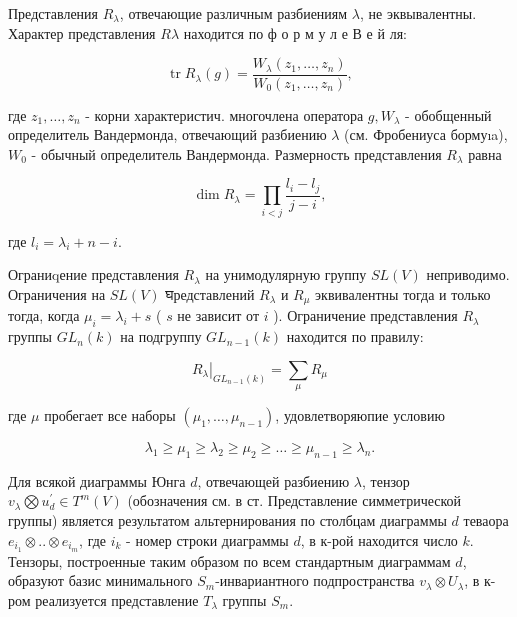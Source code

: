 \documentclass[10pt]{article}
\begin{document}
Представления $R_{\lambda}$, отвечающие различным разбиениям $\lambda$, не эквывалентны. Характер представления $R \lambda$ находится по ф о р м у л е В е й ля:



\[

\operatorname{tr} R_{\lambda}(g)=\frac{W_{\lambda}\left(z_{1}, \ldots, z_{n}\right)}{W_{0}\left(z_{1}, \ldots, z_{n}\right)},

\]



где $z_{1}, \ldots, z_{n}$ - корни характеристич. многочлена оператора $g, W_{\lambda}$ - обобщенный определитель Вандермонда, отвечающий разбиению $\lambda$ (см. Фробениуса бормуıa), $W_{0}$ - обычный определитель Вандермонда. Размерность представления $R_{\lambda}$ равна



\[

\operatorname{dim} R_{\lambda}=\prod_{i<j} \frac{l_{i}-l_{j}}{j-i},

\]



где $l_{i}=\lambda_{i}+n-i$.



Ограниqение представления $R_{\lambda}$ на унимодулярную группу $S L(V)$ неприводимо. Ограничения на $S L(V)$ घредставлений $R_{\lambda}$ и $R_{\mu}$ эквивалентны тогда и только тогда, когда $\mu_{i}=\lambda_{i}+s$ ( $s$ не зависит от $i$ ). Ограничение представления $R_{\lambda}$ группы $G L_{n}(k)$ на подгруппу $G L_{n-1}(k)$ находится по правилу:



\[

\left.R_{\lambda}\right|_{G L_{n-1}(k)}=\sum_{\mu} R_{\mu}

\]



где $\mu$ пробегает все наборы $\left(\mu_{1}, \ldots, \mu_{n-1}\right)$, удовлетворяюпие условию



\[

\lambda_{1} \geqslant \mu_{1} \geqslant \lambda_{2} \geqslant \mu_{2} \geqslant \ldots \geqslant \mu_{n-1} \geqslant \lambda_{n} .

\]



Для всякой диаграммы Юнга $d$, отвечающей разбиению $\lambda$, тензор $v_{\lambda} \bigotimes u_{d}^{\prime} \in T^{m}(V)$ (обозначения см. в ст. Представление симметрической группы) является результатом альтернирования по столбцам диаграммы $d$ теваора $e_{i_{1}} \otimes . . \otimes e_{i_{m}}$, где $i_{k}$ - номер строки диаграммы $d$, в к-рой находится число $k$. Тензоры, построенные таким образом по всем стандартным диаграммам $d$, образуют базис минимального $S_{m}$-инвариантного подпространства $v_{\lambda} \otimes U_{\lambda}$, в к-ром реализуется представление $T_{\lambda}$ группы $S_{m}$.
\end{document}
